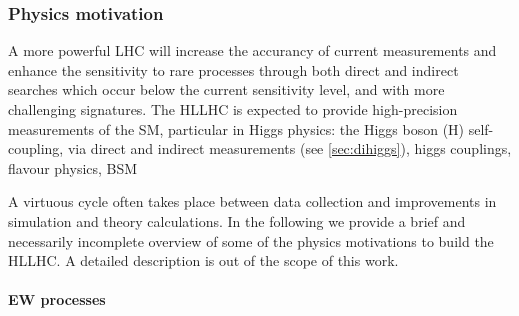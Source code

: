 \documentclass[11pt]{article}
\begin{document}
\subsubsection{Physics motivation}
\label{sec:orga30cab1}
\label{sec:hllhc_physics}

A more powerful \ac{LHC} will increase the accurancy of current measurements and enhance the sensitivity to rare processes through both direct and indirect searches which occur below the current sensitivity level, and with more challenging signatures.
The \ac{HLLHC} is expected to provide high-precision measurements of the \ac{SM}, particular in Higgs physics: the Higgs boson (H) self-coupling, via direct and indirect measurements (see \cref{sec:dihiggs}), higgs couplings, flavour physics, BSM

A virtuous cycle often takes place between data collection and improvements in simulation and theory calculations.
In the following we provide a brief and necessarily incomplete overview of some of the physics motivations to build the \ac{HLLHC}.
A detailed description is out of the scope of this work.


\paragraph{EW processes}
\end{document}
